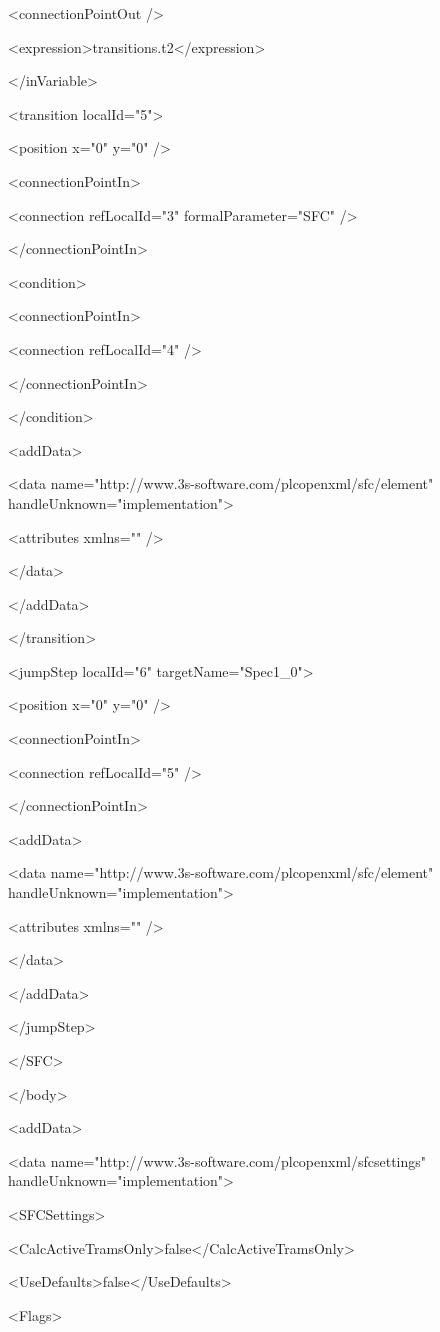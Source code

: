 {  <connectionPointOut />

  <expression>transitions.t2</expression>

 </inVariable>

 <transition localId="5">

  <position x="0" y="0" />

  <connectionPointIn>

   <connection refLocalId="3" formalParameter="SFC" />

  </connectionPointIn>

  <condition>

   <connectionPointIn>

    <connection refLocalId="4" />

   </connectionPointIn>

  </condition>

  <addData>

   <data name="http://www.3s-software.com/plcopenxml/sfc/element" handleUnknown="implementation">

    <attributes xmlns="" />

   </data>

  </addData>

 </transition>

 <jumpStep localId="6" targetName="Spec1\_0">

  <position x="0" y="0" />

  <connectionPointIn>

   <connection refLocalId="5" />

  </connectionPointIn>

  <addData>

   <data name="http://www.3s-software.com/plcopenxml/sfc/element" handleUnknown="implementation">

    <attributes xmlns="" />

   </data>

  </addData>

 </jumpStep>

</SFC>

</body>

<addData>

<data name="http://www.3s-software.com/plcopenxml/sfcsettings" handleUnknown="implementation">

 <SFCSettings>

  <CalcActiveTramsOnly>false</CalcActiveTramsOnly>

  <UseDefaults>false</UseDefaults>

  <Flags>

}
